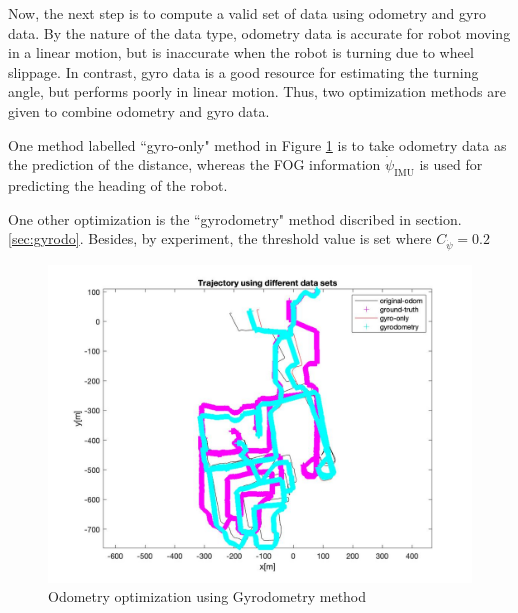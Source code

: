 Now, the next step is to compute a valid set of data using odometry and gyro data. By the nature of the data type, odometry data is accurate for robot moving in a linear motion, but is inaccurate when the robot is turning due to wheel slippage. In contrast, gyro data is a good resource for estimating the turning angle, but performs poorly in linear motion. Thus, two optimization methods are given to combine odometry and gyro data.

One method labelled ``gyro-only" method in Figure \ref{fig:Gyrodometry} is to take odometry data as the prediction of the distance, whereas the FOG information \(\dot{\psi}_{\text{IMU}}\) is used for predicting the heading of the robot. 

One other optimization is the ``gyrodometry" method discribed in section.\ref{sec:gyrodo}. Besides, by experiment, the threshold value is set where \(C_{\dot{\psi}} = 0.2\)

\begin{figure}
    \centering
    \includegraphics[width=0.8\columnwidth]{media/Gyrodometry.jpg}
    \caption{Odometry optimization using Gyrodometry method}
    \label{fig:Gyrodometry}
\end{figure}